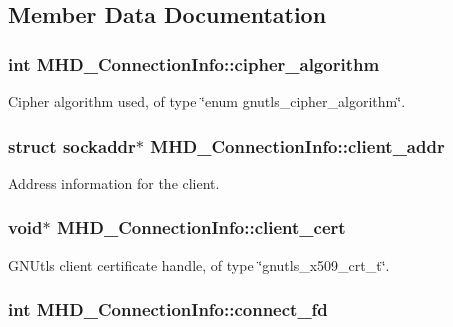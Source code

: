 \subsection{\-Member \-Data \-Documentation}
\hypertarget{unionMHD__ConnectionInfo_a0728c9f1a9c48cc61811e45b019999b1}{
\subsubsection[{cipher\-\_\-algorithm}]{\setlength{\rightskip}{0pt plus 5cm}int {\bf \-M\-H\-D\-\_\-\-Connection\-Info\-::cipher\-\_\-algorithm}}}\label{unionMHD__ConnectionInfo_a0728c9f1a9c48cc61811e45b019999b1}
\-Cipher algorithm used, of type \char`\"{}enum gnutls\-\_\-cipher\-\_\-algorithm\char`\"{}. \hypertarget{unionMHD__ConnectionInfo_ac169bc869c7d5d14d78946360309192d}{
\subsubsection[{client\-\_\-addr}]{\setlength{\rightskip}{0pt plus 5cm}struct sockaddr$\ast$ {\bf \-M\-H\-D\-\_\-\-Connection\-Info\-::client\-\_\-addr}}}\label{unionMHD__ConnectionInfo_ac169bc869c7d5d14d78946360309192d}
\-Address information for the client. \hypertarget{unionMHD__ConnectionInfo_a82eb5004c18287649f22a520482d3eb3}{
\subsubsection[{client\-\_\-cert}]{\setlength{\rightskip}{0pt plus 5cm}void$\ast$ {\bf \-M\-H\-D\-\_\-\-Connection\-Info\-::client\-\_\-cert}}}\label{unionMHD__ConnectionInfo_a82eb5004c18287649f22a520482d3eb3}
\-G\-N\-Utls client certificate handle, of type \char`\"{}gnutls\-\_\-x509\-\_\-crt\-\_\-t\char`\"{}. \hypertarget{unionMHD__ConnectionInfo_a4bf6e893d4c039ab6d3a5809576af01d}{
\subsubsection[{connect\-\_\-fd}]{\setlength{\rightskip}{0pt plus 5cm}int {\bf \-M\-H\-D\-\_\-\-Connection\-Info\-::connect\-\_\-fd}}}\label{unionMHD__ConnectionInfo_a4bf6e893d4c039ab6d3a5809576af01d}
